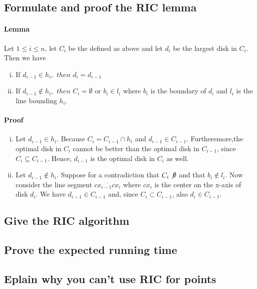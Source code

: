 \documentclass{article}
\begin{document}
\subsection{Formulate and proof the RIC lemma}
\paragraph{Lemma}
Let $1 \leq i \leq n$, let $C_i$ be the defined as above and let $d_i$ be
the largest disk in $C_i$. Then we have
\begin{enumerate}[(i)]
	\item If $d_{i-1} \in h_i,$ $then$ $d_i = d_{i-1}$
	\item If $d_{i-1} \not\in h_{i},$ $then$ $C_i = \emptyset$
		or $b_i \in l_i$ where $b_i$ is the boundary of $d_i$ and $l_i$
		is the line bounding $h_i$.
\end{enumerate}
\paragraph{Proof}
\begin{enumerate}[(i)]
	\item Let $d_{i-1} \in h_i$. Because $C_i = C_{i-1}\cap h_i$ and
		$d_{i-1} \in C_{i-1}$. Furtheremore,the optimal disk in $C_i$
		cannot be better than the optimal disk in $C_{i-1}$, since
		$C_i \subseteq C_{i-1}$. Hence, $d_{i-1}$ is the optimal disk
		in $C_i$ as well.
	\item Let $d_{i-1} \not\in h_{i}$. Suppose for a contradiction that
		$C_i \not\emptyset$ and that $b_i \not\in l_i$. Now consider
		the line segment $\overline{cx_{i-1}cx_i}$ where $cx_i$ is the
		center on the x-axis of disk $d_i$. We have
		$d_{i-1} \in C_{i-1}$ and, since $C_i \subset C_{i-1}$, also
		$d_i \in C_{i-1}$. 
\end{enumerate}

\subsection{Give the RIC algorithm}

\subsection{Prove the expected running time}
\subsection{Eplain why you can't use RIC for points}
\end{document}
